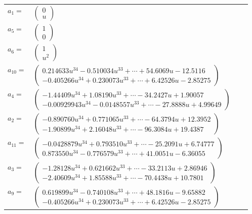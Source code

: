 \documentclass[1p]{elsarticle_modified}
\theoremstyle{definition}
\begin{document}
\begin{tabular}{m{7pt} m{180pt} m{7pt} m{180pt} }
\flushright $a_{1}=$&$\begin{pmatrix}0\\u\end{pmatrix}$ \\
\flushright $a_{5}=$&$\begin{pmatrix}1\\0\end{pmatrix}$ \\
\flushright $a_{6}=$&$\begin{pmatrix}1\\u^2\end{pmatrix}$ \\
\flushright $a_{10}=$&$\begin{pmatrix}0.214633 u^{34}-0.510034 u^{33}+\cdots+54.6069 u-12.5116\\-0.405266 u^{34}+0.230073 u^{33}+\cdots+6.42526 u-2.85275\end{pmatrix}$ \\
\flushright $a_{4}=$&$\begin{pmatrix}-1.44409 u^{34}+1.08190 u^{33}+\cdots-34.2427 u+1.90057\\-0.00929943 u^{34}-0.0148557 u^{33}+\cdots-27.8888 u+4.99649\end{pmatrix}$ \\
\flushright $a_{2}=$&$\begin{pmatrix}-0.890760 u^{34}+0.771065 u^{33}+\cdots-64.3794 u+12.3952\\-1.90899 u^{34}+2.16048 u^{33}+\cdots-96.3084 u+19.4387\end{pmatrix}$ \\
\flushright $a_{11}=$&$\begin{pmatrix}-0.0428879 u^{34}+0.793510 u^{33}+\cdots-25.2091 u+6.74777\\0.873550 u^{34}-0.776579 u^{33}+\cdots+41.0051 u-6.36055\end{pmatrix}$ \\
\flushright $a_{3}=$&$\begin{pmatrix}-1.28128 u^{34}+0.621662 u^{33}+\cdots-33.2113 u+2.86946\\-2.40609 u^{34}+1.85588 u^{33}+\cdots-70.4438 u+10.7801\end{pmatrix}$ \\
\flushright $a_{9}=$&$\begin{pmatrix}0.619899 u^{34}-0.740108 u^{33}+\cdots+48.1816 u-9.65882\\-0.405266 u^{34}+0.230073 u^{33}+\cdots+6.42526 u-2.85275\end{pmatrix}$ \\

\end{tabular}
\end{document}
